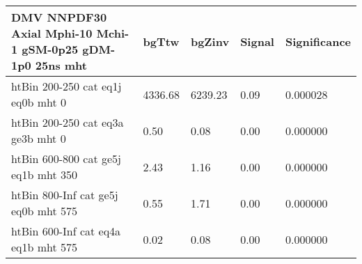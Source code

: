 


 \begin{tabular}{|l|l|l|l|l|}
	\textbf{DMV NNPDF30 Axial Mphi-10 Mchi-1 gSM-0p25 gDM-1p0 25ns mht}	 & 	bgTtw	 & 	bgZinv	 & 	Signal &	 Significance \\ 
	\hline
	htBin 200-250 cat eq1j eq0b mht 0 & 	4336.68	 & 	6239.23	 & 	0.09 	&0.000028 \\ 
	htBin 200-250 cat eq3a ge3b mht 0 & 	0.50	 & 	0.08	 & 	0.00 	&0.000000 \\ 
	htBin 600-800 cat ge5j eq1b mht 350 & 	2.43	 & 	1.16	 & 	0.00 	&0.000000 \\ 
	htBin 800-Inf cat ge5j eq0b mht 575 & 	0.55	 & 	1.71	 & 	0.00 	&0.000000 \\ 
	htBin 600-Inf cat eq4a eq1b mht 575 & 	0.02	 & 	0.08	 & 	0.00 	&0.000000 \\ 
\end{tabular}
